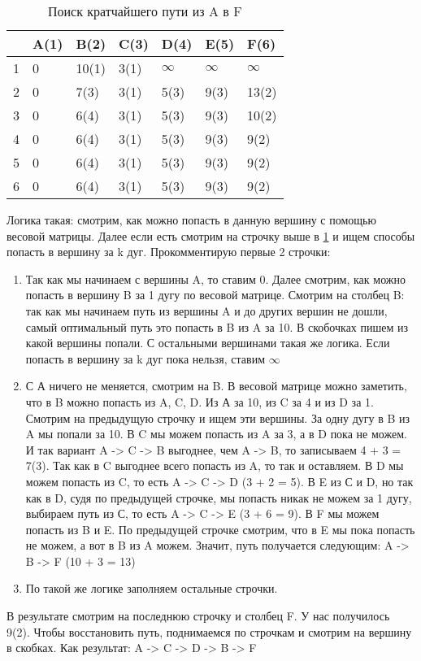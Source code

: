 \begin{table}[h]
    \centering
    \begin{tabular}[c]{ | l | l | l | l | l | l | l | }
        \hline
          & A(1) & B(2) & C(3) & D(4) & E(5) & F(6) \\ \hline
        1 & 0 & 10(1) & 3(1) & $\infty$ & $\infty$ & $\infty$ \\ \hline
        2 & 0 & 7(3) & 3(1) & 5(3) & 9(3) & 13(2) \\ \hline
        3 & 0 & 6(4) & 3(1) & 5(3) & 9(3) & 10(2) \\ \hline
        4 & 0 & 6(4) & 3(1) & 5(3) & 9(3) & 9(2) \\ \hline
        5 & 0 & 6(4) & 3(1) & 5(3) & 9(3) & 9(2) \\ \hline
        6 & 0 & 6(4) & 3(1) & 5(3) & 9(3) & 9(2) \\
        \hline
    \end{tabular}
    \caption{Поиск кратчайшего пути из A в F}
    \label{short_s}
\end{table}

Логика такая: смотрим, как можно попасть в данную вершину с помощью весовой матрицы.
Далее если есть смотрим на строчку выше в \ref{short_s} и ищем способы попасть в вершину за k дуг. Прокомментирую 
первые 2 строчки:
\begin{enumerate}
    \item Так как мы начинаем с вершины A, то ставим 0. Далее смотрим, как можно попасть 
    в вершину B за 1 дугу по весовой матрице. Смотрим на столбец B: так как мы начинаем путь из вершины A
    и до других вершин не дошли, самый оптимальный путь это попасть в B из A за 10. В скобочках пишем из 
    какой вершины попали. С остальными вершинами такая же логика. Если попасть в вершину за k дуг пока нельзя, ставим $\infty$
    \item С А ничего не меняется, смотрим на B. В весовой матрице можно заметить, что в B можно попасть из
    A, C, D. Из А за 10, из C за 4 и из D за 1. Смотрим на предыдущую строчку и ищем эти вершины. За одну дугу в B из A
    мы попали за 10. В C мы можем попасть из A за 3, а в D пока не можем. И так вариант A -> C -> B выгоднее, чем A -> B, 
    то записываем 4 + 3 = 7(3). Так как в C выгоднее всего попасть из A, то так и оставляем. В D мы можем попасть из C, то есть
    A -> C -> D (3 + 2 = 5). В E из С и D, но так как в D, судя по предыдущей строчке, мы попасть никак не можем за 1 дугу,
    выбираем путь из С, то есть A -> C -> E (3 + 6 = 9). В F мы можем попасть из B и E. По предыдущей строчке смотрим,
    что в E мы пока попасть не можем, а вот в B из A можем. Значит, путь получается следующим: A -> B -> F (10 + 3 = 13)
    \item По такой же логике заполняем остальные строчки.
\end{enumerate}
В результате смотрим на последнюю строчку и столбец F. У нас получилось 9(2). Чтобы восстановить путь, поднимаемся по строчкам
и смотрим на вершину в скобках. Как результат: A -> C -> D -> B -> F